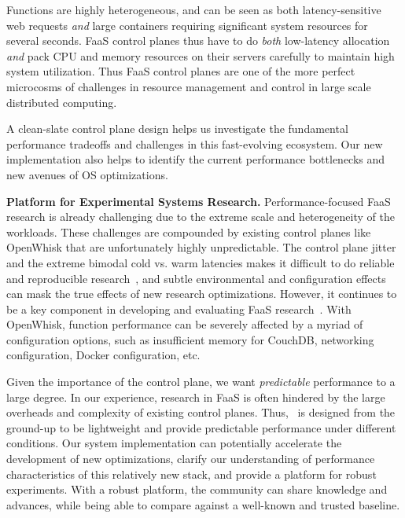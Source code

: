 Functions are highly heterogeneous, and can be seen as both latency-sensitive web requests \emph{and} large containers requiring significant system resources for several seconds. 
FaaS control planes thus have to do \emph{both} low-latency allocation \emph{and} pack CPU and memory resources on their servers carefully to maintain high system utilization.
%
Thus FaaS control planes are one of the more perfect microcosms of challenges in resource management and control in large scale distributed computing. 

A clean-slate control plane design helps us investigate the fundamental performance tradeoffs and challenges in this fast-evolving ecosystem.
Our new implementation also helps to identify the current performance bottlenecks and new avenues of OS optimizations. 


\noindent \textbf{Platform for Experimental Systems Research.}
%
Performance-focused FaaS research is already challenging due to the extreme scale and heterogeneity of the workloads.
These challenges are compounded by existing control planes like OpenWhisk that are unfortunately highly unpredictable.
The control plane jitter and the extreme bimodal cold vs. warm latencies makes it difficult to do reliable and reproducible research~\cite{mytkowicz2009producing}, and subtle environmental and configuration effects can mask the true effects of new research optimizations.
However, it continues to be a key component in developing and evaluating FaaS research~\cite{akkus_sand_2018, shahrad_serverless_2020, faascache-asplos21, faaslb-hpdc22, zhou2022aquatope, ensure-faas-acsos20, alzayat_groundhog_2022}. 
With OpenWhisk, function performance can be severely affected by a myriad of configuration options, such as insufficient memory for CouchDB, networking configuration, Docker configuration, etc. 

Given the importance of the control plane, we want \emph{predictable} performance to a large degree. 
In our experience, research in FaaS is often hindered by the large overheads and complexity of existing control planes. 
Thus, \sysname~is designed from the ground-up to be lightweight and provide predictable performance under different conditions. 
Our system implementation can potentially accelerate the development of new optimizations, clarify  our understanding of performance characteristics of this relatively new stack, and provide a platform for robust experiments. 
With a robust platform, the community can share knowledge and advances, while being able to compare against a well-known and trusted baseline.

